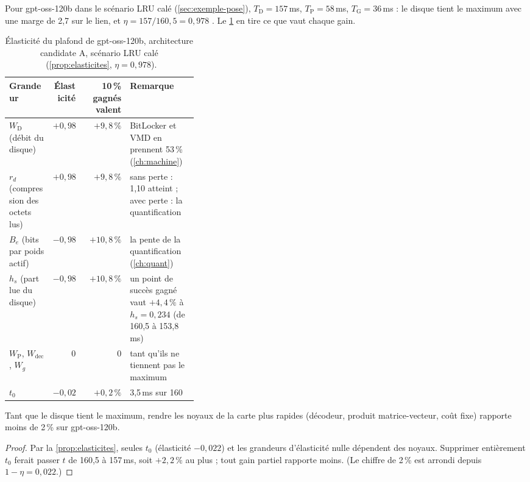 Pour gpt-oss-120b dans le scénario LRU calé (\cref{sec:exemple-pose}), $T_{\mathrm{D}} = 157$\,ms, $T_{\mathrm{P}} = 58$\,ms, $T_{\mathrm{G}} = 36$\,ms : le disque tient le maximum avec une marge de 2,7 sur le lien, et $\eta = 157/160{,}5 = 0{,}978$ \calc. Le \cref{tab:elasticites} en tire ce que vaut chaque gain.

\begin{table}[ht]
\centering\small
\caption[Ce que vaut chaque grandeur]{Élasticité du plafond de gpt-oss-120b, architecture candidate A, scénario LRU calé \calc~(\cref{prop:elasticites}, $\eta = 0{,}978$).}
\label{tab:elasticites}
\begin{tabular}{@{}lrrp{0.36\linewidth}@{}}
\toprule
Grandeur & Élasticité & 10\,\% gagnés valent & Remarque \\
\midrule
$W_{\mathrm{D}}$ (débit du disque) & $+0{,}98$ & $+9{,}8\,\%$ & BitLocker et VMD en prennent 53\,\% (\cref{ch:machine}) \\
$r_d$ (compression des octets lus) & $+0{,}98$ & $+9{,}8\,\%$ & sans perte : 1,10 atteint ; avec perte : la quantification \\
$B_e$ (bits par poids actif) & $-0{,}98$ & $+10{,}8\,\%$ & la pente de la quantification (\cref{ch:quant}) \\
$h_s$ (part lue du disque) & $-0{,}98$ & $+10{,}8\,\%$ & un point de succès gagné vaut $+4{,}4\,\%$ à $h_s = 0{,}234$ (de 160,5 à 153,8\,ms) \\
$W_{\mathrm{P}}$, $W_{\mathrm{dec}}$, $W_g$ & 0 & 0 & tant qu'ils ne tiennent pas le maximum \\
$t_0$ & $-0{,}02$ & $+0{,}2\,\%$ & 3,5\,ms sur 160 \\
\bottomrule
\end{tabular}
\end{table}

\begin{corollaire}\label{cor:ornement}
Tant que le disque tient le maximum, rendre les noyaux de la carte plus rapides (décodeur, produit matrice-vecteur, coût fixe) rapporte moins de 2\,\% sur gpt-oss-120b.
\end{corollaire}

\begin{proof}
Par la \cref{prop:elasticites}, seules $t_0$ (élasticité $-0{,}022$) et les grandeurs d'élasticité nulle dépendent des noyaux. Supprimer entièrement $t_0$ ferait passer $t$ de 160,5 à 157\,ms, soit $+2{,}2\,\%$ au plus ; tout gain partiel rapporte moins. (Le chiffre de 2\,\% est arrondi depuis $1 - \eta = 0{,}022$.)
\end{proof}

